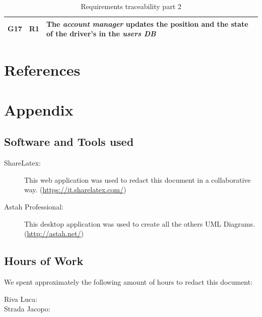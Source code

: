 \documentclass[a4paper]{article}
\begin{document}
\begin{table} [H]
\begin{center}
\begin{tabular}{ |M|M|m{\customTableWidth}|  }
    \hline
    \hline

    \textbf{G17} & \textbf{R1} & The \textit{account manager} updates the position and the state of the driver's in the \textit{users DB}\\
    
    \hline


        

\end{tabular}
\end{center}
\label{table:requirementsTraceabilityPt2}
\caption{Requirements traceability part 2}
\end{table}

\section{References}

\section{Appendix}

\subsection{Software and Tools used}

\begin{description}
\item[ShareLatex:] This web application was used to redact this document in a collaborative way. 
\newline (\url{https://it.sharelatex.com/})
\item[Astah Professional:] This desktop application was used to create all the others UML Diagrams.
\newline (\url{http://astah.net/})
\end{description}

\subsection{Hours of Work}
We spent approximately the following amount of hours to redact this document:
\begin{description}
\item[Riva Luca:] 
\item[Strada Jacopo:] 
\end{description}
\end{document}
